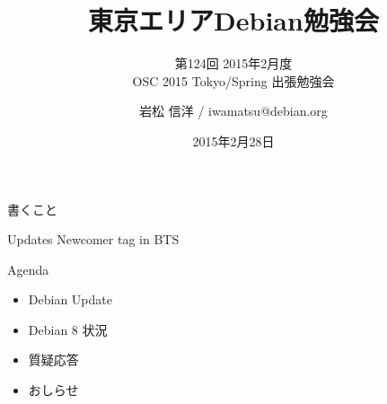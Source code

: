 書くこと

Updates
Newcomer tag in BTS

\fi

\title{東京エリアDebian勉強会}
\subtitle{第124回 2015年2月度\\OSC 2015 Tokyo/Spring 出張勉強会}
\author{岩松 信洋 / iwamatsu@debian.org}
\date{2015年2月28日}



\begin{frame}
\titlepage{}
\end{frame}

\begin{frame}{Agenda}
  \begin{itemize}
   \item Debian Update
   \item Debian 8 状況
   \item 質疑応答
   \item おしらせ
  \end{itemize}
\end{frame}

%
%

